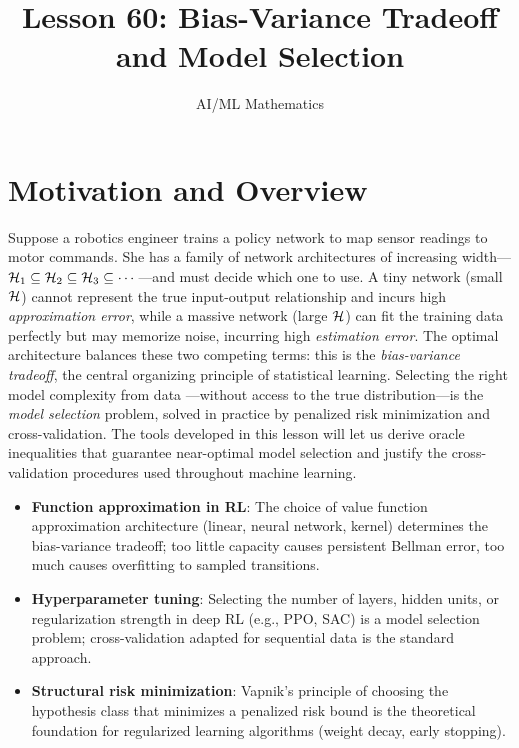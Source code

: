 \documentclass[11pt,a4paper]{article}
\title{Lesson 60: Bias-Variance Tradeoff and Model Selection}
\author{AI/ML Mathematics}
\date{}
\begin{document}
\maketitle
\tableofcontents
\newpage


\section{Motivation and Overview}
\label{sec:motivation}

Suppose a robotics engineer trains a policy network to map sensor
readings to motor commands.  She has a family of network architectures
of increasing width---$\mathcal{H}_1 \subseteq \mathcal{H}_2 \subseteq
\mathcal{H}_3 \subseteq \cdots$---and must decide which one to use.  A
tiny network (small $\mathcal{H}$) cannot represent the true input-output
relationship and incurs high \emph{approximation error}, while a
massive network (large $\mathcal{H}$) can fit the training data perfectly
but may memorize noise, incurring high \emph{estimation error}.  The
optimal architecture balances these two competing terms: this is the
\emph{bias-variance tradeoff}, the central organizing principle of
statistical learning.  Selecting the right model complexity from data
---without access to the true distribution---is the \emph{model
selection} problem, solved in practice by penalized risk minimization
and cross-validation.  The tools developed in this lesson will let us
derive oracle inequalities that guarantee near-optimal model selection
and justify the cross-validation procedures used throughout machine
learning.

\begin{rlconnection}[title={Why Bias-Variance and Model Selection
    Matter for RL/ML}]
\begin{itemize}[nosep]
    \item \textbf{Function approximation in RL}: The choice of value
    function approximation architecture (linear, neural network,
    kernel) determines the bias-variance tradeoff; too little capacity
    causes persistent Bellman error, too much causes overfitting to
    sampled transitions.
    \item \textbf{Hyperparameter tuning}: Selecting the number of
    layers, hidden units, or regularization strength in deep RL
    (e.g., PPO, SAC) is a model selection problem; cross-validation
    adapted for sequential data is the standard approach.
    \item \textbf{Structural risk minimization}: Vapnik's principle of
    choosing the hypothesis class that minimizes a penalized risk
    bound is the theoretical foundation for regularized learning
    algorithms (weight decay, early stopping).
\end{itemize}
\end{rlconnection}
\end{document}
